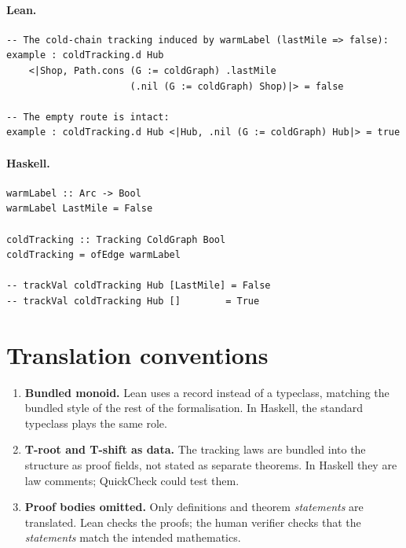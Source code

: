 \documentclass[11pt,a4paper]{article}
\begin{document}
\paragraph{Lean.}
\begin{lstlisting}[style=lean]
-- The cold-chain tracking induced by warmLabel (lastMile => false):
example : coldTracking.d Hub
    <|Shop, Path.cons (G := coldGraph) .lastMile
                      (.nil (G := coldGraph) Shop)|> = false

-- The empty route is intact:
example : coldTracking.d Hub <|Hub, .nil (G := coldGraph) Hub|> = true
\end{lstlisting}

\paragraph{Haskell.}
\begin{lstlisting}[style=haskell]
warmLabel :: Arc -> Bool
warmLabel LastMile = False

coldTracking :: Tracking ColdGraph Bool
coldTracking = ofEdge warmLabel

-- trackVal coldTracking Hub [LastMile] = False
-- trackVal coldTracking Hub []        = True
\end{lstlisting}


\section{Translation conventions}

\begin{enumerate}
\item \textbf{Bundled monoid.}  Lean uses a record  instead of a
  typeclass, matching the bundled style of the rest of the formalisation.
  In Haskell, the standard  typeclass plays the same role.

\item \textbf{T-root and T-shift as data.}  The tracking laws are bundled into
  the  structure as proof fields, not stated as separate
  theorems.  In Haskell they are law comments; QuickCheck could test them.

\item \textbf{Proof bodies omitted.}  Only definitions and theorem
  \emph{statements} are translated.  Lean checks the proofs; the human
  verifier checks that the \emph{statements} match the intended mathematics.
\end{enumerate}
\end{document}
